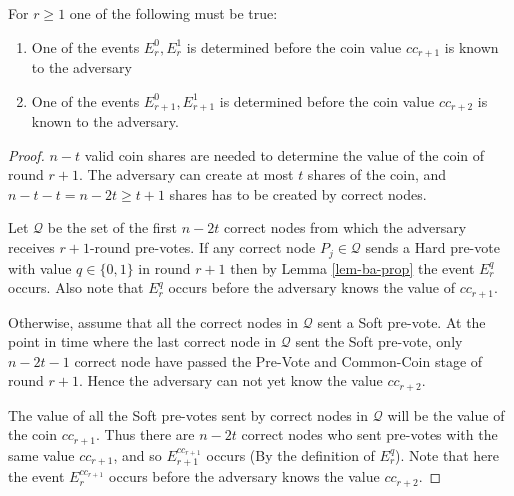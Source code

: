 \begin{lem}
  \label{lem-ba-e-before-coin}
  For $r \geq 1$ one of the following must be true:
  \begin{enumerate}
    \item One of the events $E_r^0, E_r^1$ is determined before the coin value
      ${cc}_{r+1}$ is known to the adversary
    \item One of the events $E_{r+1}^0, E_{r+1}^1$ is determined before the coin
      value ${cc}_{r+2}$ is known to the adversary.
  \end{enumerate}
\end{lem}
\begin{proof}
  $n-t$ valid coin shares are needed to determine the value of the coin of round
  $r+1$. The adversary can create at most $t$ shares of the coin, and $n-t-t =
  n-2t \geq t+1$ shares has to be created by correct nodes.

  Let $\mathcal{Q}$ be the set of the first $n-2t$ correct nodes from which the
  adversary receives $r+1$-round pre-votes. If any correct node $P_j \in
  \mathcal{Q}$ sends a Hard pre-vote with value $q \in \{0,1\}$ in round $r+1$
  then by Lemma \ref{lem-ba-prop} the event $E_r^q$ occurs. Also note that
  $E_r^q$ occurs before the adversary knows the value of ${cc}_{r+1}$.

  Otherwise, assume that all the correct nodes in $\mathcal{Q}$ sent a Soft
  pre-vote. At the point in time where the last correct node in $\mathcal{Q}$
  sent the Soft pre-vote, only $n-2t-1$ correct node have passed the Pre-Vote
  and Common-Coin stage of round $r+1$. Hence the adversary can not yet know the
  value ${cc}_{r+2}$. 
  
  The value of all the Soft pre-votes sent by correct nodes in $\mathcal{Q}$
  will be the value of the coin ${cc}_{r+1}$. Thus there are $n-2t$ correct
  nodes who sent pre-votes with the same value ${cc}_{r+1}$, and so
  $E_{r+1}^{{cc}_{r+1}}$ occurs (By the definition of $E_{r}^q$). Note that here
  the event $E_r^{{cc}_{r+1}}$ occurs before the adversary knows the value
  ${cc}_{r+2}$.
\end{proof}

